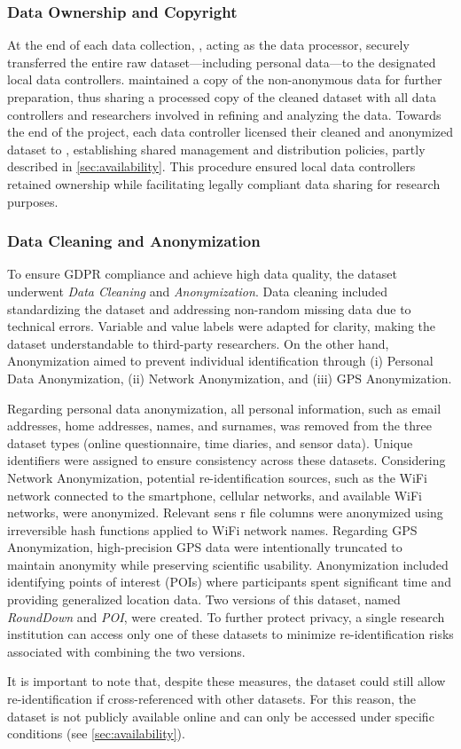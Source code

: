 \subsubsection{Data Ownership and Copyright}

At the end of each data collection, \UNITN, acting as the data processor, securely transferred the entire raw dataset—including personal data—to the designated local data controllers. \UNITN maintained a copy of the non-anonymous data for further preparation, thus sharing a processed copy of the cleaned dataset with all data controllers and researchers involved in refining and analyzing the data. Towards the end of the project, each data controller licensed their cleaned and anonymized dataset to \UNITN, establishing shared management and distribution policies, partly described in \cref{sec:availability}. This procedure ensured local data controllers retained ownership while facilitating legally compliant data sharing for research purposes.

\subsubsection{Data Cleaning and Anonymization}

To ensure GDPR compliance and achieve high data quality, the dataset underwent \textit{Data Cleaning} and \textit{Anonymization}. Data cleaning included standardizing the dataset and addressing non-random missing data due to technical errors. Variable and value labels were adapted for clarity, making the dataset understandable to third-party researchers. On the other hand, Anonymization aimed to prevent individual identification through (i) Personal Data Anonymization, (ii) Network Anonymization, and (iii) GPS Anonymization. 

Regarding personal data anonymization, all personal information, such as email addresses, home addresses, names, and surnames, was removed from the three dataset types (online questionnaire, time diaries, and sensor data). Unique identifiers were assigned to ensure consistency across these datasets. Considering Network Anonymization, potential re-identification sources, such as the WiFi network connected to the smartphone, cellular networks, and available WiFi networks, were anonymized. Relevant sens r file columns were anonymized using irreversible hash functions applied to WiFi network names. Regarding GPS Anonymization, high-precision GPS data were intentionally truncated to maintain anonymity while preserving scientific usability. Anonymization included identifying points of interest (POIs) where participants spent significant time and providing generalized location data. Two versions of this dataset, named \textit{RoundDown} and \textit{POI}, were created. To further protect privacy, a single research institution can access only one of these datasets to minimize re-identification risks associated with combining the two versions.

It is important to note that, despite these measures, the dataset could still allow re-identification if cross-referenced with other datasets. For this reason, the dataset is not publicly available online and can only be accessed under specific conditions (see \cref{sec:availability}).